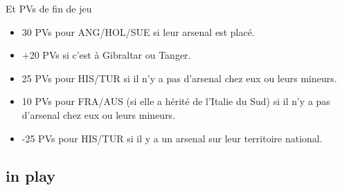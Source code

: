 \begin{todo}
  Et PVs de fin de jeu
  \begin{itemize}
  \item 30 PVs pour ANG/HOL/SUE si leur arsenal est placé.
  \item +20 PVs si c'est à Gibraltar ou Tanger.
  \item 25 PVs pour HIS/TUR si il n'y a pas d'arsenal chez eux ou
    leurs mineurs.
  \item 10 PVs pour FRA/AUS (si elle a hérité de l'Italie du Sud) si
    il n'y a pas d'arsenal chez eux ou leurs mineurs.
  \item -25 PVs pour HIS/TUR si il y a un arsenal sur leur territoire
    national.
  \end{itemize}
\end{todo}

\subsection{ in play}
